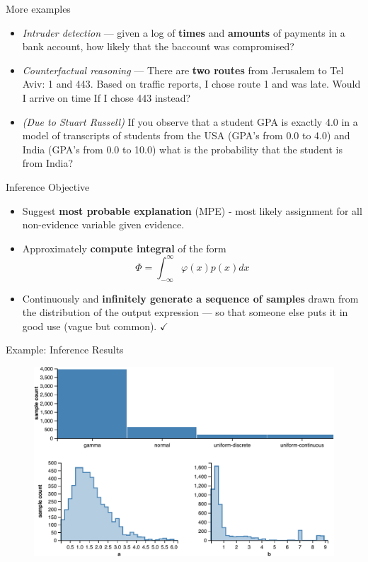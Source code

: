 \documentclass{beamer}
\begin{document}
\begin{frame}{More examples}
    \begin{itemize}
        \item \textit{Intruder detection} --- 
            given a log of \textbf{times} and \textbf{amounts} of
            payments in a bank account, how likely that the baccount was
            compromised?
        \pause
        \item \textit{Counterfactual reasoning} --- There are
            \textbf{two routes} from Jerusalem to Tel Aviv:
            1 and 443.  Based on traffic reports, I chose route
            1 and was late. Would I arrive on time If I chose 443
            instead?
        \pause 
        \item \textit{(Due to Stuart Russell)} If you observe that a
            student GPA is exactly 4.0 in a model of
            transcripts of students from the USA (GPA's from
            0.0 to 4.0) and India (GPA's from 0.0 to
            10.0) what is the probability that the student
            is from India? 
    \end{itemize}
\end{frame}

\begin{frame}{Inference Objective}
\begin{itemize}
\item Suggest \textbf{most probable explanation} (MPE) - most likely assignment
  for all non-evidence variable given evidence.
  \pause
\item Approximately \textbf{compute integral} of the
  form $$\Phi=\int_{-\infty}^{\infty} \varphi(x)p(x) dx$$
  \pause
\item Continuously and \textbf{infinitely generate a sequence of samples} drawn
  from the distribution of the output expression --- so that someone
  else puts it in good use (vague but common). $\checkmark$
\end{itemize}
\end{frame}

\begin{frame}{Example: Inference Results}
  \begin{figure}[H]
      \includegraphics[scale=0.6]{models-results.pdf}
  \end{figure}
\end{frame}
\end{document}
